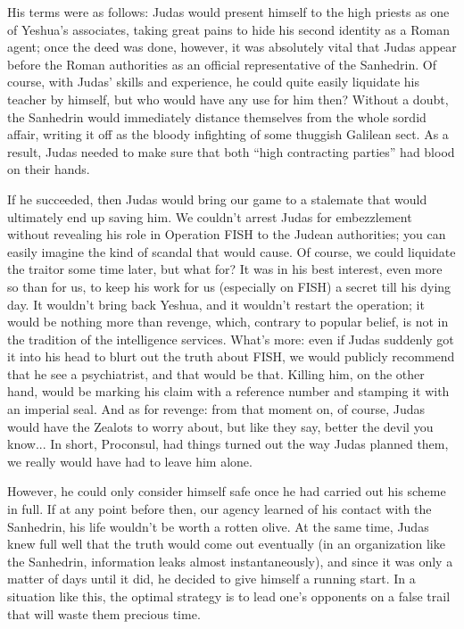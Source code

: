 His terms were as follows: Judas would present himself to the high priests as one of Yeshua's associates, taking great pains to hide his second identity as a Roman agent; once the deed was done, however, it was absolutely vital that Judas appear before the Roman authorities as an official representative of the Sanhedrin. Of course, with Judas' skills and experience, he could quite easily liquidate his teacher by himself, but who would have any use for him then? Without a doubt, the Sanhedrin would immediately distance themselves from the whole sordid affair, writing it off as the bloody infighting of some thuggish Galilean sect. As a result, Judas needed to make sure that both ``high contracting parties'' had blood on their hands.

If he succeeded, then Judas would bring our game to a stalemate that would ultimately end up saving him. We couldn't arrest Judas for embezzlement without revealing his role in Operation FISH to the Judean authorities; you can easily imagine the kind of scandal that would cause. Of course, we could liquidate the traitor some time later, but what for? It was in his best interest, even more so than for us, to keep his work for us (especially on FISH) a secret till his dying day. It wouldn't bring back Yeshua, and it wouldn't restart the operation; it would be nothing more than revenge, which, contrary to popular belief, is not in the tradition of the intelligence services. What's more: even if Judas suddenly got it into his head to blurt out the truth about FISH, we would publicly recommend that he see a psychiatrist, and that would be that. Killing him, on the other hand, would be marking his claim with a reference number and stamping it with an imperial seal. And as for revenge: from that moment on, of course, Judas would have the Zealots to worry about, but like they say, better the devil you know... In short, Proconsul, had things turned out the way Judas planned them, we really would have had to leave him alone.

However, he could only consider himself safe once he had carried out his scheme in full. If at any point before then, our agency learned of his contact with the Sanhedrin, his life wouldn't be worth a rotten olive. At the same time, Judas knew full well that the truth would come out eventually (in an organization like the Sanhedrin, information leaks almost instantaneously), and since it was only a matter of days until it did, he decided to give himself a running start. In a situation like this, the optimal strategy is to lead one's opponents on a false trail that will waste them precious time.

